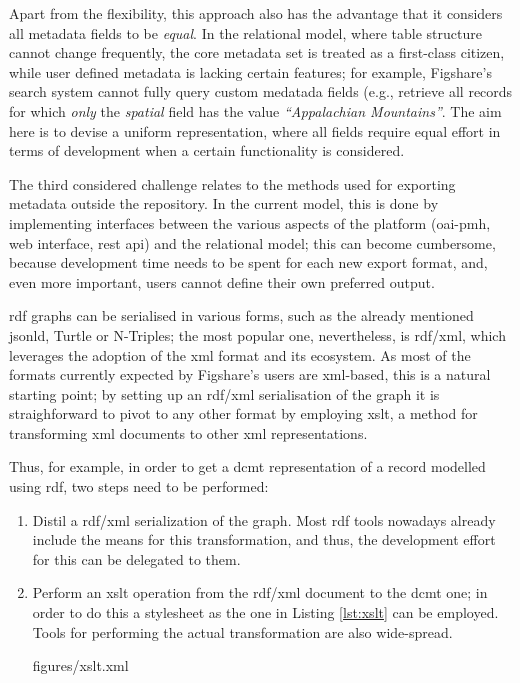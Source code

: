 Apart from the flexibility, this approach also has the advantage that it considers all metadata fields to be \emph{equal}. In the relational model, where table structure cannot change frequently, the core metadata set is treated as a first-class citizen, while user defined metadata is lacking certain features; for example, Figshare's search system cannot fully query custom medatada fields (e.g., retrieve all records for which \emph{only} the \emph{spatial} field has the value \emph{``Appalachian Mountains''}. The aim here is to devise a uniform representation, where all fields require equal effort in terms of development when a certain functionality is considered.

The third considered challenge relates to the methods used for exporting metadata outside the repository. In the current model, this is done by implementing interfaces between the various aspects of the platform (\gls{oai}-\gls{pmh}, web interface, \gls{rest} \gls{api}) and the relational model; this can become cumbersome, because development time needs to be spent for each new export format, and, even more important, users cannot define their own preferred output.

\gls{rdf} graphs can be serialised in various forms, such as the already mentioned \gls{jsonld}, Turtle or N-Triples; the most popular one, nevertheless, is \gls{rdf}/\gls{xml}, which leverages the adoption of the \gls{xml} format and its ecosystem. As most of the formats currently expected by Figshare's users are \gls{xml}-based, this is a natural starting point; by setting up an \gls{rdf}/\gls{xml} serialisation of the
graph it is straighforward to pivot to any other format by employing \gls{xslt}, a method for transforming \gls{xml} documents to other \gls{xml} representations.

Thus, for example, in order to get a \gls{dcmt} representation of a record modelled using \gls{rdf}, two steps need to be performed:

\begin{enumerate}
    \item Distil a \gls{rdf}/\gls{xml} serialization of the graph. Most \gls{rdf} tools nowadays already include the means for this transformation, and thus, the development effort for this can be delegated to them.
    \item Perform an \gls{xslt} operation from the \gls{rdf}/\gls{xml} document to the \gls{dcmt} one; in order to do this a stylesheet as the one in Listing \ref{lst:xslt} can be employed. Tools for performing the actual transformation are also wide-spread.


  {figures/xslt.xml}

\end{enumerate}

